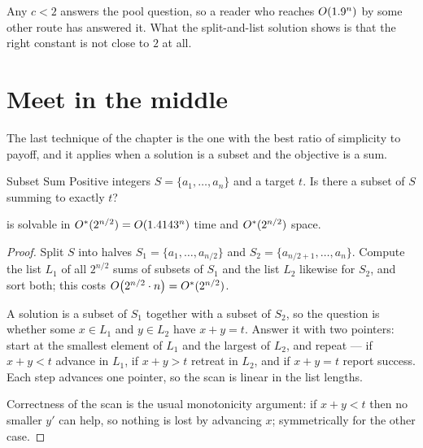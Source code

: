 Any $c < 2$ answers the pool question, so a reader who reaches
$O\!\left(1.9^n\right)$ by some other route has answered it. What the split-and-list
solution shows is that the right constant is not close to $2$ at all.

\section{Meet in the middle}
\label{sec:meet-in-the-middle}

The last technique of the chapter is the one with the best ratio of simplicity
to payoff, and it applies when a solution is a subset and the objective is a
sum.

\begin{probdef}{Subset Sum}
  \instance Positive integers $S = \{a_1,\ldots,a_n\}$ and a target $t$.
  \question Is there a subset of $S$ summing to exactly $t$?
\end{probdef}

\begin{theorem}\label{thm:subset-sum-mitm}
 is solvable in $O^{*}(2^{n/2}) = O\!\left(1.4143^n\right)$ time and
$O^{*}(2^{n/2})$ space.
\end{theorem}

\begin{proof}
Split $S$ into halves $S_1 = \{a_1,\ldots,a_{n/2}\}$ and
$S_2 = \{a_{n/2+1},\ldots,a_n\}$. Compute the list $L_1$ of all $2^{n/2}$ sums
of subsets of $S_1$ and the list $L_2$ likewise for $S_2$, and sort both; this
costs $O\!\left(2^{n/2} \cdot n\right) = O^{*}(2^{n/2})$.

A solution is a subset of $S_1$ together with a subset of $S_2$, so the question
is whether some $x \in L_1$ and $y \in L_2$ have $x + y = t$. Answer it with two
pointers: start at the smallest element of $L_1$ and the largest of $L_2$, and
repeat --- if $x + y < t$ advance in $L_1$, if $x+y > t$ retreat in $L_2$, and
if $x + y = t$ report success. Each step advances one pointer, so the scan is
linear in the list lengths.

Correctness of the scan is the usual monotonicity argument: if $x + y < t$ then
no smaller $y'$ can help, so nothing is lost by advancing $x$; symmetrically for
the other case.
\end{proof}

